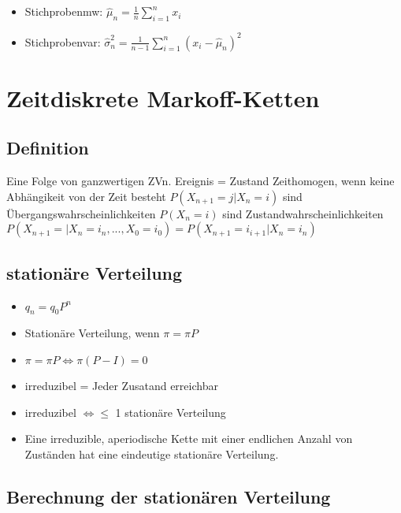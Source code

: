 \documentclass{article}
\begin{document}
\subsection{}
\begin{itemize}
\item Stichprobenmw: $\hat{\mu}_n = \frac{1}{n} \sum_{i=1}^n x_i$
\item Stichprobenvar: $\hat{\sigma}_n^2 = \frac{1}{n-1} \sum_{i=1}^n(x_i-\hat{\mu}_n)^2$
\end{itemize}


\section{Zeitdiskrete Markoff-Ketten}
\subsection{Definition}

Eine Folge von ganzwertigen ZVn. \newline
Ereignis = Zustand \newline
Zeithomogen, wenn keine Abhängikeit von der Zeit besteht \newline
$P(X_{n+1} = j | X_n = i)$ sind Übergangswahrscheinlichkeiten \newline
$P(X_n = i)$ sind Zustandwahrscheinlichkeiten \newline
$P(X_{n+1} = | X_n = i_n , ..., X_0 = i_0) = P(X_{n+1} = i_{i+1} | X_n = i_n)$


\subsection{station{\"a}re Verteilung}
\begin{itemize}
\item $q_n = q_0 P^n$
\item Station{\"a}re Verteilung, wenn $\pi = \pi P$ 
\item $\pi = \pi P \Leftrightarrow \pi(P - I) = 0$
\item irreduzibel = Jeder Zusatand erreichbar
\item irreduzibel $\Leftrightarrow \leq $ 1 stationäre Verteilung
\item Eine irreduzible, aperiodische Kette mit einer endlichen Anzahl von Zuständen hat eine eindeutige stationäre Verteilung.
\end{itemize}

\subsection{Berechnung der stationären Verteilung}
\end{document}
